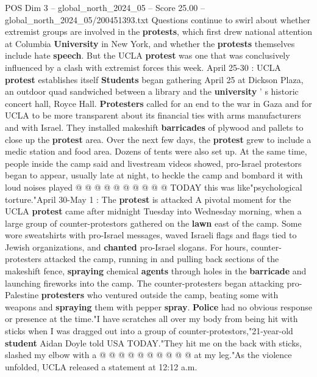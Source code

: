 \begin{textsample}{POS Dim 3 – global\_north\_2024\_05 – Score 25.00 – global\_north\_2024\_05/200451393.txt}  \label{ex:f3_pos_014}
Questions continue to swirl about whether extremist groups are involved in the \textbf{protests}, which first drew national attention at Columbia \textbf{University} in New York, and whether the \textbf{protests} themselves include hate \textbf{speech}.
But the UCLA \textbf{protest} was one that was conclusively influenced by a clash with extremist forces this week.
April 25-30 : UCLA \textbf{protest} establishes itself \textbf{Students} began gathering April 25 at Dickson Plaza, an outdoor quad sandwiched between a library and the \textbf{university} ' s historic concert hall, Royce Hall. \textbf{Protesters} called for an end to the war in Gaza and for UCLA to be more transparent about its financial ties with arms manufacturers and with Israel.
They installed makeshift \textbf{barricades} of plywood and pallets to close up the \textbf{protest} area.
Over the next few days, the \textbf{protest} grew to include a medic station and food area.
Dozens of tents were also set up.
At the same time, people inside the camp said and livestream videos showed, pro-Israel protestors began to appear, usually late at night, to heckle the camp and bombard it with loud noises played @ @ @ @ @ @ @ @ @ @ TODAY this was like"psychological torture."April 30-May 1 : The \textbf{protest} is attacked A pivotal moment for the UCLA \textbf{protest} came after midnight Tuesday into Wednesday morning, when a large group of counter-protestors gathered on the \textbf{lawn} east of the camp.
Some wore sweatshirts with pro-Israel messages, waved Israeli flags and flags tied to Jewish organizations, and \textbf{chanted} pro-Israel slogans.
For hours, counter-protesters attacked the camp, running in and pulling back sections of the makeshift fence, \textbf{spraying} chemical \textbf{agents} through holes in the \textbf{barricade} and launching fireworks into the camp.
The counter-protesters began attacking pro-Palestine \textbf{protesters} who ventured outside the camp, beating some with weapons and \textbf{spraying} them with pepper \textbf{spray}. \textbf{Police} had no obvious response or presence at the time."I have scratches all over my body from being hit with sticks when I was dragged out into a group of counter-protestors,"21-year-old \textbf{student} Aidan Doyle told USA TODAY."They hit me on the back with sticks, slashed my elbow with a @ @ @ @ @ @ @ @ @ @ at my leg."As the violence unfolded, UCLA released a statement at 12:12 a.m.

\end{textsample}
